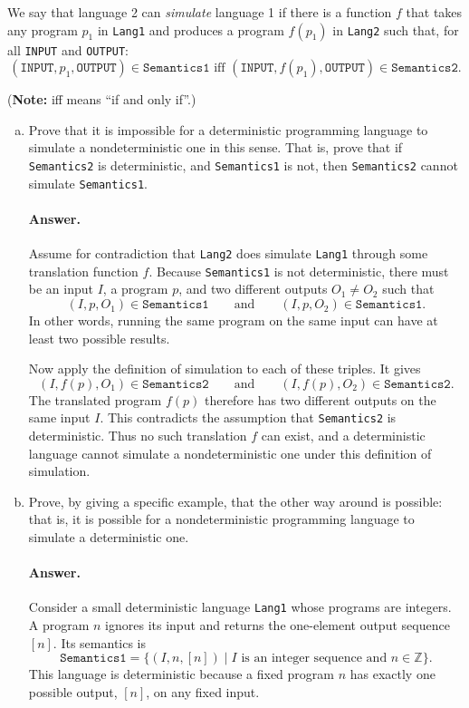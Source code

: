 \documentclass{article}
\begin{document}
\begin{enumerate}
We say that language 2 can \emph{simulate} language 1 if there is a function $f$ that takes any program
$p_1$ in \texttt{Lang1} and produces a program $f(p_1)$ in \texttt{Lang2} such that,
for all \texttt{INPUT} and \texttt{OUTPUT}:
$$
(\texttt{INPUT}, p_1, \texttt{OUTPUT}) \in \texttt{Semantics1}
\text{ iff }
(\texttt{INPUT}, f(p_1), \texttt{OUTPUT}) \in \texttt{Semantics2}.
$$

(\textbf{Note:} iff means ``if and only if''.)

\begin{enumerate}[(a)]
\item Prove that it is impossible for a deterministic programming language to simulate a nondeterministic one in
this sense. That is, prove that if
\texttt{Semantics2} is deterministic, and \texttt{Semantics1} is not, then \texttt{Semantics2} cannot simulate \texttt{Semantics1}.

\paragraph{Answer.}
Assume for contradiction that \texttt{Lang2} does simulate \texttt{Lang1}
through some translation function $f$.  Because \texttt{Semantics1} is not
deterministic, there must be an input $I$, a program $p$, and two different
outputs $O_1\ne O_2$ such that
\[
(I,p,O_1)\in\texttt{Semantics1}
\qquad\text{and}\qquad
(I,p,O_2)\in\texttt{Semantics1}.
\]
In other words, running the same program on the same input can have at least
two possible results.

Now apply the definition of simulation to each of these triples.  It gives
\[
(I,f(p),O_1)\in\texttt{Semantics2}
\qquad\text{and}\qquad
(I,f(p),O_2)\in\texttt{Semantics2}.
\]
The translated program $f(p)$ therefore has two different outputs on the
same input $I$.  This contradicts the assumption that
\texttt{Semantics2} is deterministic.  Thus no such translation $f$ can
exist, and a deterministic language cannot simulate a nondeterministic one
under this definition of simulation.

\item Prove, by giving a specific example, that the other way around is possible:
that is, it is possible for a nondeterministic programming language to simulate a deterministic one.

\paragraph{Answer.}
Consider a small deterministic language \texttt{Lang1} whose programs are
integers.  A program $n$ ignores its input and returns the one-element output
sequence $[n]$.  Its semantics is
\[
\texttt{Semantics1}
=\{(I,n,[n])\mid I\text{ is an integer sequence and }n\in\mathbb{Z}\}.
\]
This language is deterministic because a fixed program $n$ has exactly one
possible output, $[n]$, on any fixed input.


\end{enumerate}
\end{enumerate}
\end{document}
